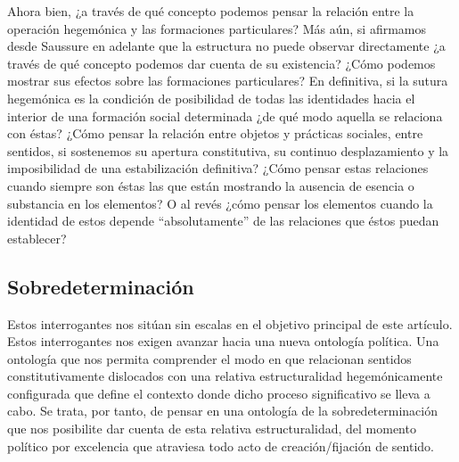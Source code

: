 \documentclass{book}
\begin{document}
Ahora bien, ¿a través de qué concepto podemos pensar la relación entre
la operación hegemónica y las formaciones particulares? Más aún, si
afirmamos desde Saussure en adelante que la estructura no puede observar
directamente ¿a través de qué concepto podemos dar cuenta de su
existencia? ¿Cómo podemos mostrar sus efectos sobre las formaciones
particulares? En definitiva, si la sutura hegemónica es la condición de
posibilidad de todas las identidades hacia el interior de una formación
social determinada ¿de qué modo aquella se relaciona con éstas? ¿Cómo
pensar la relación entre objetos y prácticas sociales, entre sentidos,
si sostenemos su apertura constitutiva, su continuo desplazamiento y la
imposibilidad de una estabilización definitiva? ¿Cómo pensar estas
relaciones cuando siempre son éstas las que están mostrando la ausencia
de esencia o substancia en los elementos? O al revés ¿cómo pensar los
elementos cuando la identidad de estos depende ``absolutamente'' de las
relaciones que éstos puedan establecer?

\hypertarget{sobredeterminaciuxf3n}{%
\subsection{Sobredeterminación}\label{sobredeterminaciuxf3n}}

Estos interrogantes nos sitúan sin escalas en el objetivo principal de
este artículo. Estos interrogantes nos exigen avanzar hacia una nueva
ontología política. Una ontología que nos permita comprender el modo en
que relacionan sentidos constitutivamente dislocados con una relativa
estructuralidad hegemónicamente configurada que define el contexto donde
dicho proceso significativo se lleva a cabo. Se trata, por tanto, de
pensar en una ontología de la sobredeterminación que nos posibilite dar
cuenta de esta relativa estructuralidad, del momento político por
excelencia que atraviesa todo acto de creación/fijación de sentido.
\end{document}
